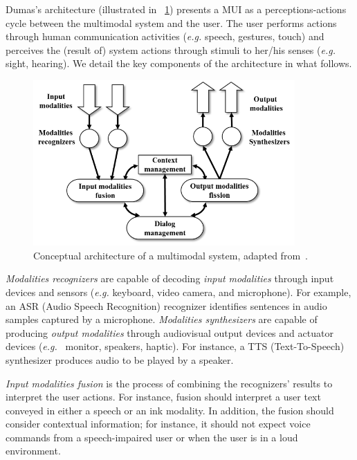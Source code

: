 \documentclass[
  doutorado,
  american
]{ThesisPUC}
\newcommand{\fig}[1]{\figurename~\ref{#1}}
\newcommand{\captionvspace}{\vspace{-1.3em}}
\begin{document}
Dumas’s architecture (illustrated in \fig{fig:dulmas}) presents a MUI as a
perceptions-actions cycle between the multimodal system and the user. The user
performs actions through human communication activities (\textit{e.g.} speech, gestures,
touch) and perceives the (result of) system actions through stimuli to her/his
senses (\textit{e.g.} sight, hearing). We detail the key components of the architecture in
what follows.

\begin{figure}[!ht]
\begin{center}
	\includegraphics[width=10cm, keepaspectratio]{img/img6.png}
	\caption[Conceptual architecture of a multimodal system]{Conceptual 
	architecture of a multimodal system, adapted from~\cite{dumas_multimodal_2009}.}
	\label{fig:dulmas}
    \captionvspace
\end{center}
\end{figure}

\textit{Modalities recognizers} are capable of decoding \textit{input
modalities} through input devices and sensors (\textit{e.g.} keyboard, video camera, and
microphone). For example, an ASR (Audio Speech Recognition) recognizer
identifies sentences in audio samples captured by a microphone.
\textit{Modalities synthesizers} are capable of producing \textit{output
modalities} through audiovisual output devices and actuator devices (\textit{e.g.}~
monitor, speakers, haptic). For instance, a TTS (Text-To-Speech) synthesizer
produces audio to be played by a speaker.

\textit{Input modalities fusion} is the process of combining the recognizers’
results to interpret the user actions. For instance, fusion should interpret a
user text conveyed in either a speech or an ink modality. In addition, the
fusion should consider contextual information; for instance, it should not
expect voice commands from a speech-impaired user or when the user is in a loud
environment. 
\end{document}
